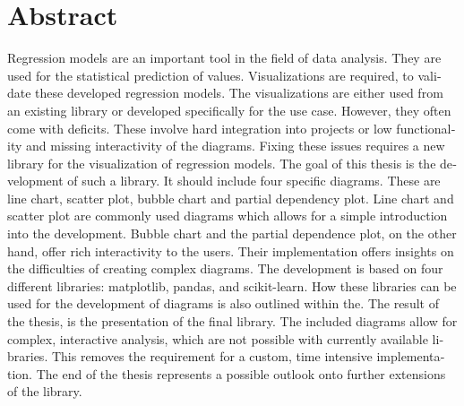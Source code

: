 \chapter{Abstract}


\begin{english} %

Regression models are an important tool in the field of data analysis. They are used for the statistical prediction of values. Visualizations are required, to validate these developed regression models. The visualizations are either used from an existing library or developed specifically for the use case. However, they often come with deficits. These involve hard integration into projects or low functionality and missing interactivity of the diagrams. Fixing these issues requires a new library for the visualization of regression models. The goal of this thesis is the development of such a library. It should include four specific diagrams. These are line chart, scatter plot, bubble chart and partial dependency plot. Line chart and scatter plot are commonly used diagrams which allows for a simple introduction into the development. Bubble chart and the partial dependence plot, on the other hand, offer rich interactivity to the users. Their implementation offers insights on the difficulties of creating complex diagrams. The development is based on four different libraries: matplotlib, pandas, and scikit-learn. How these libraries can be used for the development of diagrams is also outlined within the. The result of the thesis, is the presentation of the final library. The included diagrams allow for complex, interactive analysis, which are not possible with currently available libraries. This removes the requirement for a custom, time intensive implementation. The end of the thesis represents a possible outlook onto further extensions of the library.

\end{english}

